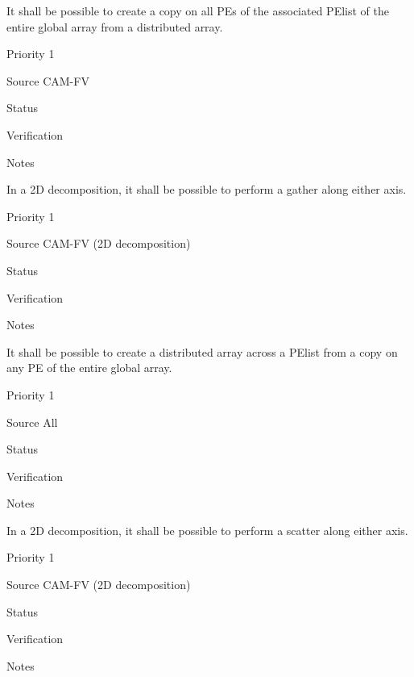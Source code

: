 
It shall be possible to create a copy on all PEs of the associated
PElist of the entire global array from a distributed array.

\begin{reqlist}
\item[Priority] 1
\item[Source] CAM-FV
\item[Status]
\item[Verification]
\item[Notes] 
\end{reqlist}

 \label{DG:PartGather}

In a 2D decomposition, it shall be possible to perform a gather along
either axis.

\begin{reqlist}
\item[Priority] 1
\item[Source] CAM-FV (2D decomposition)
\item[Status]
\item[Verification]
\item[Notes] 
\end{reqlist}


It shall be possible to create a distributed array across a PElist
from a copy on any PE of the entire global array.

\begin{reqlist}
\item[Priority] 1
\item[Source] All
\item[Status]
\item[Verification]
\item[Notes] 
\end{reqlist}


In a 2D decomposition, it shall be possible to perform a scatter along
either axis.

\begin{reqlist}
\item[Priority] 1
\item[Source] CAM-FV (2D decomposition)
\item[Status]
\item[Verification]
\item[Notes] 
\end{reqlist}

